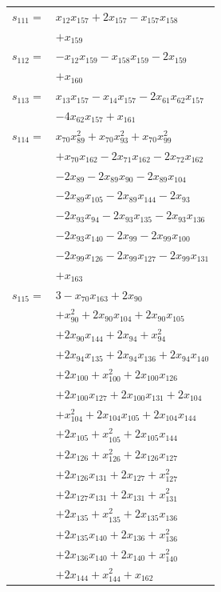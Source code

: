 \begin{longtable}{@{}r@{\;}l@{}}
\(s_{111}=\) & \(\displaystyle x_{12}x_{157} +2x_{157} -x_{157}x_{158}\) \\
 & \(\displaystyle +x_{159}\) \\[3pt]
\(s_{112}=\) & \(\displaystyle -x_{12}x_{159} -x_{158}x_{159} -2x_{159}\) \\
 & \(\displaystyle +x_{160}\) \\[3pt]
\(s_{113}=\) & \(\displaystyle x_{13}x_{157} -x_{14}x_{157} -2x_{61}x_{62}x_{157}\) \\
 & \(\displaystyle -4x_{62}x_{157} +x_{161}\) \\[3pt]
\(s_{114}=\) & \(\displaystyle x_{70}x_{89}^{2} +x_{70}x_{93}^{2} +x_{70}x_{99}^{2}\) \\
 & \(\displaystyle +x_{70}x_{162} -2x_{71}x_{162} -2x_{72}x_{162}\) \\
 & \(\displaystyle -2x_{89} -2x_{89}x_{90} -2x_{89}x_{104}\) \\
 & \(\displaystyle -2x_{89}x_{105} -2x_{89}x_{144} -2x_{93}\) \\
 & \(\displaystyle -2x_{93}x_{94} -2x_{93}x_{135} -2x_{93}x_{136}\) \\
 & \(\displaystyle -2x_{93}x_{140} -2x_{99} -2x_{99}x_{100}\) \\
 & \(\displaystyle -2x_{99}x_{126} -2x_{99}x_{127} -2x_{99}x_{131}\) \\
 & \(\displaystyle +x_{163}\) \\[3pt]
\(s_{115}=\) & \(\displaystyle 3 -x_{70}x_{163} +2x_{90}\) \\
 & \(\displaystyle +x_{90}^{2} +2x_{90}x_{104} +2x_{90}x_{105}\) \\
 & \(\displaystyle +2x_{90}x_{144} +2x_{94} +x_{94}^{2}\) \\
 & \(\displaystyle +2x_{94}x_{135} +2x_{94}x_{136} +2x_{94}x_{140}\) \\
 & \(\displaystyle +2x_{100} +x_{100}^{2} +2x_{100}x_{126}\) \\
 & \(\displaystyle +2x_{100}x_{127} +2x_{100}x_{131} +2x_{104}\) \\
 & \(\displaystyle +x_{104}^{2} +2x_{104}x_{105} +2x_{104}x_{144}\) \\
 & \(\displaystyle +2x_{105} +x_{105}^{2} +2x_{105}x_{144}\) \\
 & \(\displaystyle +2x_{126} +x_{126}^{2} +2x_{126}x_{127}\) \\
 & \(\displaystyle +2x_{126}x_{131} +2x_{127} +x_{127}^{2}\) \\
 & \(\displaystyle +2x_{127}x_{131} +2x_{131} +x_{131}^{2}\) \\
 & \(\displaystyle +2x_{135} +x_{135}^{2} +2x_{135}x_{136}\) \\
 & \(\displaystyle +2x_{135}x_{140} +2x_{136} +x_{136}^{2}\) \\
 & \(\displaystyle +2x_{136}x_{140} +2x_{140} +x_{140}^{2}\) \\
 & \(\displaystyle +2x_{144} +x_{144}^{2} +x_{162}\) \\[3pt]
\end{longtable}
\endgroup
